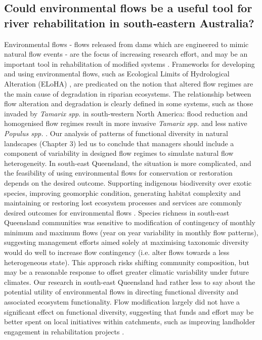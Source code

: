 \documentclass[openright,12pt,a4paper]{memoir}
\begin{document}
{{\subsection{Could environmental flows be a useful tool for river rehabilitation in south-eastern Australia?}
Environmental flows - flows released from dams which are engineered to mimic natural flow events - are the focus of increasing research effort, and may be an important tool in rehabilitation of modified systems \citep{Arthington2012}. Frameworks for developing and using environmental flows, such as Ecological Limits of Hydrological Alteration (ELoHA) \citep{Poff2010a}, are predicated on the notion that altered flow regimes are the main cause of degradation in riparian ecosystems. The relationship between flow alteration and degradation is clearly defined in some systems, such as those invaded by \textit{Tamarix spp}. in south-western North America: flood reduction and homogenised flow regimes result in more invasive \textit{Tamarix spp.} and less native \textit{Populus spp.} \citep{Stromberg2007, Shafroth2010}. Our analysis of patterns of functional diversity in natural landscapes (Chapter 3) led us to conclude that managers should include a component of variability in designed flow regimes to simulate natural flow heterogeneity. In south-east Queensland, the situation is more complicated, and the feasibility of using environmental flows for conservation or restoration depends on the desired outcome. Supporting indigenous biodiversity over exotic species, improving geomorphic condition, generating habitat complexity and maintaining or restoring lost ecosystem processes and services are commonly desired outcomes for environmental flows \citep{Richter2007, Poff2010a, Meitzen2013}. Species richness in south-east Queensland communities was sensitive to modification of contingency of monthly minimum and maximum flows (year on year variability in monthly flow patterns), suggesting management efforts aimed solely at maximising taxonomic diversity would do well to increase flow contingency (i.e. alter flows towards a less heterogeneous state). This approach risks shifting community composition, but may be a reasonable response to offset greater climatic variability under future climates. Our research in south-east Queensland had rather less to say about the potential utility of environmental flows in directing functional diversity and associated ecosystem functionality. Flow modification largely did not have a significant effect on functional diversity, suggesting that funds and effort may be better spent on local initiatives within catchments, such as improving landholder engagement in rehabilitation projects \citep{McDonald2009}.

}}
\end{document}
